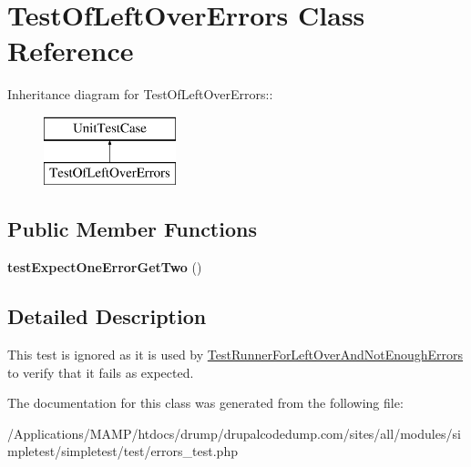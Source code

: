 \hypertarget{class_test_of_left_over_errors}{
\section{TestOfLeftOverErrors Class Reference}
\label{class_test_of_left_over_errors}
}
Inheritance diagram for TestOfLeftOverErrors::\begin{figure}[H]
\begin{center}
\leavevmode
\includegraphics[height=2cm]{class_test_of_left_over_errors}
\end{center}
\end{figure}
\subsection*{Public Member Functions}
\begin{DoxyCompactItemize}
\item 
\hypertarget{class_test_of_left_over_errors_a8e4e6f8e53054c33af8a19a68a4498f7}{
{\bfseries testExpectOneErrorGetTwo} ()}
\label{class_test_of_left_over_errors_a8e4e6f8e53054c33af8a19a68a4498f7}

\end{DoxyCompactItemize}


\subsection{Detailed Description}
This test is ignored as it is used by \hyperlink{class_test_runner_for_left_over_and_not_enough_errors}{TestRunnerForLeftOverAndNotEnoughErrors} to verify that it fails as expected.

The documentation for this class was generated from the following file:\begin{DoxyCompactItemize}
\item 
/Applications/MAMP/htdocs/drump/drupalcodedump.com/sites/all/modules/simpletest/simpletest/test/errors\_\-test.php\end{DoxyCompactItemize}
